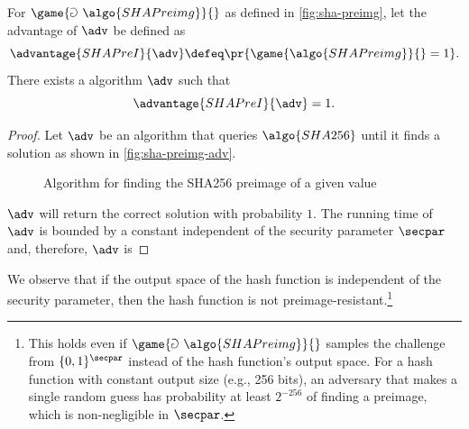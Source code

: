 \begin{proposition}
 For $\game{\Game~\algo{SHAPreimg}}{}$ as defined in \autoref{fig:sha-preimg}, let the advantage of $\adv$ be defined as
 \[
  \advantage{SHAPreI}{\adv} \defeq \pr{\game{\algo{SHAPreimg}}{} = 1}.
 \]
 There exists a \ppt algorithm $\adv$ such that
 \[
 \advantage{SHAPreI}{\adv} = 1.
 \]
\end{proposition}

\begin{proof}
  Let $\adv$ be an algorithm that queries $\algo{SHA256}$ until it finds a solution as shown in \autoref{fig:sha-preimg-adv}.
  \begin{figure}[tbhp]
  \begin{center}
    \begin{tcolorbox}[width=5cm]
      \begin{pchstack}[center]
      \end{pchstack}
    \end{tcolorbox}
  \end{center}
  \caption{Algorithm for finding the SHA256 preimage of a given value \label{fig:sha-preimg-adv}}
  \end{figure}
  $\adv$ will return the correct solution with probability $1$.
  The running time of $\adv$ is bounded by a constant independent of the security parameter $\secpar$ and, therefore, $\adv$ is \ppt
\end{proof}


We observe that if the output space of the hash function is independent of the security parameter, then the hash function is not preimage-resistant.\footnote{This holds even if $\game{\Game~\algo{SHAPreimg}}{}$ samples the challenge from $\{0,1\}^\secpar$ instead of the hash function's output space.
For a hash function with constant output size (e.g., 256 bits), an adversary that makes a single random guess has probability at least $2^{-256}$ of finding a preimage, which is non-negligible in $\secpar$.}

